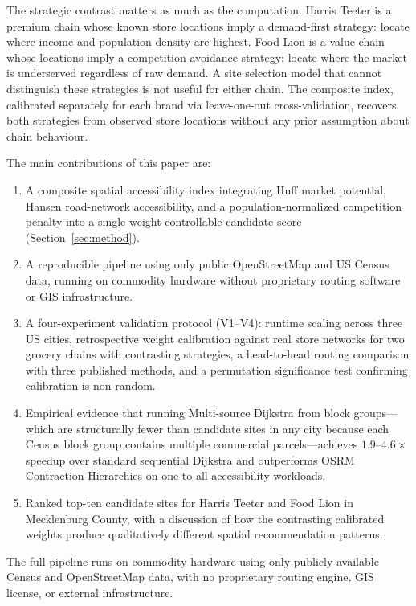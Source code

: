 \documentclass[conference]{IEEEtran}
\begin{document}
The strategic contrast matters as much as the computation. Harris
Teeter is a premium chain whose known store locations imply a
demand-first strategy: locate where income and population density are
highest. Food Lion is a value chain whose locations imply a
competition-avoidance strategy: locate where the market is underserved
regardless of raw demand. A site selection model that cannot
distinguish these strategies is not useful for either chain. The
composite index, calibrated separately for each brand via
leave-one-out cross-validation, recovers both strategies from observed
store locations without any prior assumption about chain behaviour.

The main contributions of this paper are:
\begin{enumerate}
    \item A composite spatial accessibility index integrating Huff
    market potential, Hansen road-network accessibility, and a
    population-normalized competition penalty into a single
    weight-controllable candidate score (Section~\ref{sec:method}).
    \item A reproducible pipeline using only public OpenStreetMap
    and US Census data, running on commodity hardware without
    proprietary routing software or GIS infrastructure.
    \item A four-experiment validation protocol (V1--V4): runtime
    scaling across three US cities, retrospective weight calibration
    against real store networks for two grocery chains with contrasting
    strategies, a head-to-head routing comparison with three published
    methods, and a permutation significance test confirming calibration
    is non-random.
    \item Empirical evidence that running Multi-source Dijkstra from
    block groups---which are structurally fewer than candidate sites
    in any city because each Census block group contains multiple
    commercial parcels---achieves $1.9$--$4.6\times$ speedup over
    standard sequential Dijkstra and outperforms OSRM Contraction
    Hierarchies on one-to-all accessibility workloads.
    \item Ranked top-ten candidate sites for Harris Teeter and Food
    Lion in Mecklenburg County, with a discussion of how the
    contrasting calibrated weights produce qualitatively different
    spatial recommendation patterns.
\end{enumerate}

The full pipeline runs on commodity hardware using only publicly
available Census and OpenStreetMap data, with no proprietary routing
engine, GIS license, or external infrastructure.
\end{document}
